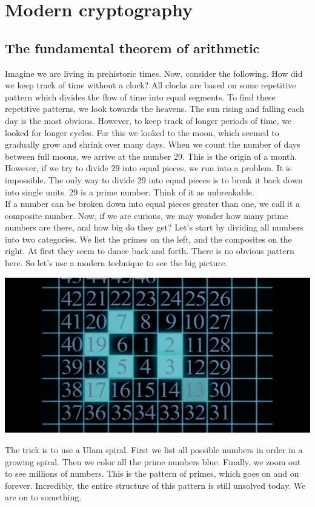 \documentclass{report}
\begin{document}
\chapter{Modern cryptography }
\newpage
\section{The fundamental theorem of arithmetic}

Imagine we are living in prehistoric times. Now, consider the following. How did we keep track of time without a clock? All clocks are based on some repetitive pattern which divides the flow of time into equal segments. To find these repetitive patterns, we look towards the heavens. The sun rising and falling each day is the most obvious. However, to keep track of longer periods of time, we looked for longer cycles. For this we looked to the moon, which seemed to gradually grow and shrink over many days. When we count the number of days between full moons, we arrive at the number 29. This is the origin of a month. However, if we try to divide 29 into equal pieces, we run into a problem. It is impossible. The only way to divide 29 into equal pieces is to break it back down into single units. 29 is a prime number. Think of it as unbreakable. \\
If a number can be broken down into equal pieces greater than one, we call it a composite number. Now, if we are curious, we may wonder how many prime numbers are there, and how big do they get? Let's start by dividing all numbers into two categories. We list the primes on the left, and the composites on the right. At first they seem to dance back and forth. There is no obvious pattern here. So let's use a modern technique to see the big picture. 
\begin{center}
	\includegraphics[scale=1]{21.png}
\end{center}
The trick is to use a Ulam spiral. First we list all possible numbers in order in a growing spiral. Then we color all the prime numbers blue. Finally, we zoom out to see millions of numbers. This is the pattern of primes, which goes on and on forever. Incredibly, the entire structure of this pattern is still unsolved today. We are on to something.\\
\end{document}
